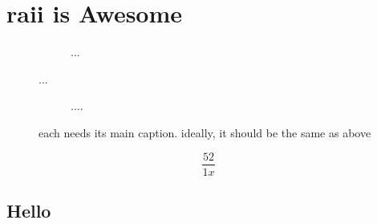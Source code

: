 %
%
%

\chapter{\texorpdfstring{\Acrshort{raii}}{RAII} is Awesome}
\label{appendix:listings}

% 

\begin{figure}[ht]
  \begin{center}
    \begin{subfigure}[t]{0.48\textwidth} %
      \caption{...}
    \end{subfigure}
  \end{center}
  \caption{...}
\end{figure}

\begin{figure}[ht]
  \ContinuedFloat
  \begin{center}
    \begin{subfigure}[t]{0.48\textwidth}
      \caption{....}
    \end{subfigure}
  \end{center}
  \caption{each needs its main caption. ideally, it should be the same as above}
\end{figure}

\begin{equation}
  \frac{52}{1x}
\end{equation}

\section{Hello}

